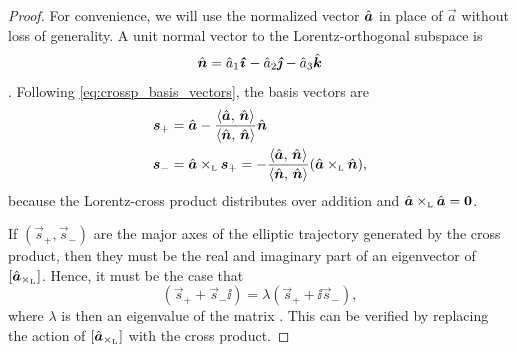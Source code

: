 \begin{proof}
    For convenience, we will use the normalized vector $\uvec{a}$ in place of $\vec{a}$ without loss of generality. 
    A unit normal vector to the Lorentz-orthogonal subspace is 
    \[\uvec{n} = \hat{a}_1\quati - \hat{a}_2\quatj - \hat{a}_3\quatk\]. 
    Following \cref{eq:crossp_basis_vectors}, the basis vectors are
    \begin{equation}
        \begin{split}
            \vec{s}_+ &= \uvec{a} - \frac{ \inner{\uvec{a}}{\uvec{n}} }{ \inner{\uvec{n}}{\uvec{n}} } \uvec{n} \\
            \vec{s}_- &= \lorcrossp{\uvec{a}}{\vec{s}_+} = -\frac{ \inner{\uvec{a}}{\uvec{n}} }{ \inner{\uvec{n}}{\uvec{n}} } \qty(\lorcrossp{\uvec{a}}{\uvec{n}}),
        \end{split}
    \end{equation}
    because the Lorentz-cross product distributes over addition and \(\lorcrossp{\uvec{a}}{\uvec{a}} = \mathbf{0}\). 

    If \((\vec{s}_+, \vec{s}_-)\) are the major axes of the elliptic trajectory generated by the cross product, then they must be the real and imaginary part of an eigenvector of \([\uvec{a}_{\lorcrossp{}{}}]\). Hence, it must be the case that 
    \begin{equation}
        [\uvec{a}_{\lorcrossp{}{}}](\vec{s}_+ + \vec{s}_-\ii) = \lambda(\vec{s}_+ + \ii\vec{s}_-),
\end{equation} 
    where \(\lambda\) is then an eigenvalue of the matrix \cite{Edwards2018}. This can be verified by replacing the action of \([\uvec{a}_{\lorcrossp{}{}}]\) with the cross product. 
    

\end{proof}
